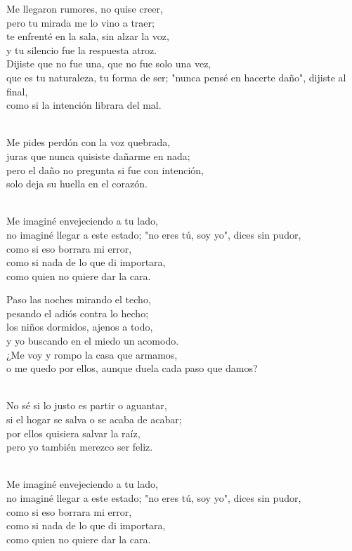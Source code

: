 \begin{lyrics}
Me llegaron rumores, no quise creer,\\
pero tu mirada me lo vino a traer;\\
te enfrenté en la sala, sin alzar la voz,\\
y tu silencio fue la respuesta atroz.\\
Dijiste que no fue una, que no fue solo una vez,\\
que es tu naturaleza, tu forma de ser;
"nunca pensé en hacerte daño", dijiste al final,\\
como si la intención librara del mal.

\\
Me pides perdón con la voz quebrada,\\
juras que nunca quisiste dañarme en nada;\\
pero el daño no pregunta si fue con intención,\\
solo deja su huella en el corazón.

\\
Me imaginé envejeciendo a tu lado,\\
no imaginé llegar a este estado;
"no eres tú, soy yo", dices sin pudor,\\
como si eso borrara mi error,\\
como si nada de lo que di importara,\\
como quien no quiere dar la cara.

Paso las noches mirando el techo,\\
pesando el adiós contra lo hecho;\\
los niños dormidos, ajenos a todo,\\
y yo buscando en el miedo un acomodo.\\
¿Me voy y rompo la casa que armamos,\\
o me quedo por ellos, aunque duela cada paso que damos?

\\
No sé si lo justo es partir o aguantar,\\
si el hogar se salva o se acaba de acabar;\\
por ellos quisiera salvar la raíz,\\
pero yo también merezco ser feliz.

\\
Me imaginé envejeciendo a tu lado,\\
no imaginé llegar a este estado;
"no eres tú, soy yo", dices sin pudor,\\
como si eso borrara mi error,\\
como si nada de lo que di importara,\\
como quien no quiere dar la cara.


\end{lyrics}
